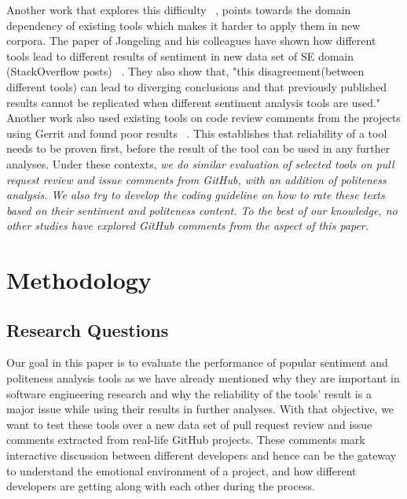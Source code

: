 Another work that explores this difficulty ~\cite{novielli2015challenges}, points towards the domain dependency of existing tools which makes it harder to apply them in new corpora. The paper of Jongeling and his colleagues have shown how different tools lead to different results of sentiment in new data set of SE domain (StackOverflow posts) ~\cite{jongeling2017negative}. They also show that, "this disagreement(between different tools) can lead to diverging conclusions and that previously published results cannot be replicated when different sentiment analysis tools are used." Another work also used existing tools on code review comments from the projects using Gerrit and found poor results ~\cite{ahmed2017senticr}. This establishes that reliability of a tool needs to be proven first, before the result of the tool can be used in any further analyses.
\newline
\newline
Under these contexts, \textit{we do similar evaluation of selected tools on pull request review and issue comments from GitHub, with an addition of politeness analysis. We also try to develop the coding guideline on how to rate these texts based on their sentiment and politeness content. To the best of our knowledge, no other studies have explored GitHub comments from the aspect of this paper.}
   



\section{Methodology}
\subsection{Research Questions}
Our goal in this paper is to evaluate the performance of popular sentiment and politeness analysis tools as we have already mentioned why they are important in software engineering research and why the reliability of the tools' result is a major issue while using their results in further analyses. With that objective, we want to test these tools over a new data set of pull request review and issue comments extracted from real-life GitHub projects. These comments mark interactive discussion between different developers and hence can be the gateway to understand the emotional environment of a project, and how different developers are getting along with each other during the process. 

